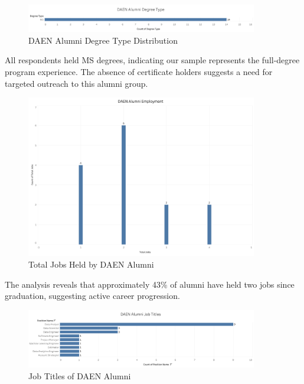 \documentclass[12pt,a4paper]{article}
\begin{document}
\begin{figure}[H]
    \centering
    \includegraphics[width=0.9\textwidth]{visualizations/degree-type.png}
    \caption{DAEN Alumni Degree Type Distribution}
    \label{fig:degree-type}
\end{figure}
All respondents held MS degrees, indicating our sample represents the full-degree program experience. The absence of certificate holders suggests a need for targeted outreach to this alumni group.

\begin{figure}[H]
    \centering
    \includegraphics[width=0.9\textwidth]{visualizations/total-jobs.png}
    \caption{Total Jobs Held by DAEN Alumni}
    \label{fig:total-jobs}
\end{figure}
The analysis reveals that approximately 43\% of alumni have held two jobs since graduation, suggesting active career progression.

\begin{figure}[H]
    \centering
    \includegraphics[width=0.9\textwidth]{visualizations/job-titles.png}
    \caption{Job Titles of DAEN Alumni}
    \label{fig:job-titles}
\end{figure}
\end{document}
